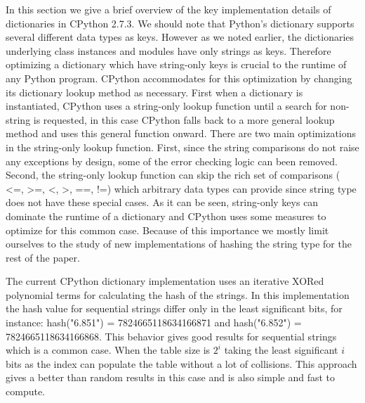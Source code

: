 \documentclass[11pt]{article}
\begin{document}
In this section we give a brief overview of the key implementation details of dictionaries in CPython 2.7.3.
We should note that Python’s dictionary supports several different data types as keys. However as we noted earlier, the dictionaries underlying class instances and modules have only strings as keys. Therefore optimizing a dictionary which have string-only keys is crucial to the runtime of any Python program. CPython accommodates for this optimization by changing its dictionary lookup method as necessary. First when a dictionary is instantiated, CPython uses a string-only lookup function until a search for non-string is requested, in this case CPython falls back to a more general lookup method and uses this general function onward. There are two main optimizations in the string-only lookup function. First, since the string comparisons do not raise any exceptions by design, some of the error checking logic can been removed. Second, the string-only lookup function can skip the rich set of comparisons ( <=, >=, <, >, ==, !=) which arbitrary data types can provide since string type does not have these special cases.  As it can be seen, string-only keys can dominate the runtime of a dictionary and CPython uses some measures to optimize for this common case. Because of this importance we mostly limit ourselves to the study of new implementations of hashing the string type for the rest of the paper.

The current CPython dictionary implementation uses an iterative XORed polynomial terms for calculating the hash of the strings. In this implementation the hash value for sequential strings differ only in the least significant bits, for instance: hash("6.851") = 7824665118634166871 and hash("6.852") = 7824665118634166868. This behavior gives good results for sequential strings which is a common case. When the table size is $2^i$ taking the least significant $i$ bits as the index can populate the table without a lot of collisions. This approach gives a better than random results in this case and is also simple and fast to compute.
\end{document}

